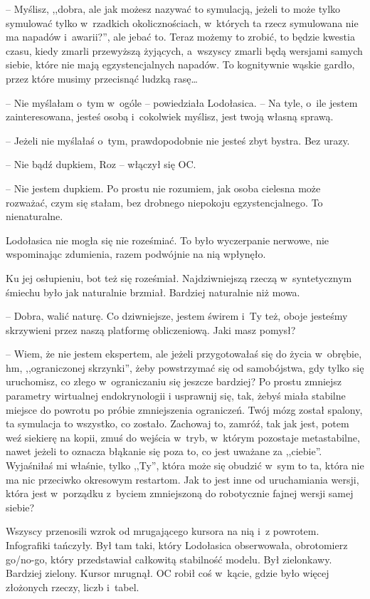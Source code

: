 \documentclass[oneside,polish,11pt,sfheadings]{mwbk}
\begin{document}
-- Myślisz, ,,dobra, ale jak możesz nazywać to symulacją, jeżeli to może
tylko symulować tylko w~rzadkich okolicznościach, w~których ta rzecz
symulowana nie ma napadów i~awarii?'', ale jebać to. Teraz możemy to
zrobić, to będzie kwestia czasu, kiedy zmarli przewyższą żyjących, a~wszyscy zmarli będą wersjami samych siebie, które nie mają
egzystencjalnych napadów. To kognitywnie wąskie gardło, przez które
musimy przecisnąć ludzką rasę\ldots 

-- Nie myślałam o~tym w~ogóle -- powiedziała Lodołasica. -- Na tyle, o~ile
jestem zainteresowana, jesteś osobą i~cokolwiek myślisz, jest twoją
własną sprawą.

-- Jeżeli nie myślałaś o~tym, prawdopodobnie nie jesteś zbyt bystra. Bez
urazy.

-- Nie bądź dupkiem, Roz -- włączył się OC.

-- Nie jestem dupkiem. Po prostu nie rozumiem, jak osoba cielesna może
rozważać, czym się stałam, bez drobnego niepokoju egzystencjalnego. To
nienaturalne.

Lodołasica nie mogła się nie roześmiać. To było wyczerpanie nerwowe, nie
wspominając zdumienia, razem podwójnie na nią wpłynęło.

Ku jej osłupieniu, bot też się roześmiał. Najdziwniejszą rzeczą w~syntetycznym śmiechu było jak naturalnie brzmiał. Bardziej naturalnie
niż mowa.

-- Dobra, walić naturę. Co dziwniejsze, jestem świrem i~Ty też, oboje
jesteśmy skrzywieni przez naszą platformę obliczeniową. Jaki masz
pomysł?

-- Wiem, że nie jestem ekspertem, ale jeżeli przygotowałaś się do życia w~obrębie, hm, ,,ograniczonej skrzynki'', żeby powstrzymać się od
samobójstwa, gdy tylko się uruchomisz, co złego w~ograniczaniu się
jeszcze bardziej? Po prostu zmniejsz parametry wirtualnej endokrynologii
i usprawnij się, tak, żebyś miała stabilne miejsce do powrotu po próbie
zmniejszenia ograniczeń. Twój mózg został spalony, ta symulacja to
wszystko, co zostało. Zachowaj to, zamróź, tak jak jest, potem weź
siekierę na kopii, zmuś do wejścia w~tryb, w~którym pozostaje
metastabilne, nawet jeżeli to oznacza błąkanie się poza to, co jest
uważane za ,,ciebie''. Wyjaśniłaś mi właśnie, tylko ,,Ty'', która może
się obudzić w~sym to ta, która nie ma nic przeciwko okresowym restartom.
Jak to jest inne od uruchamiania wersji, która jest w~porządku z~byciem
zmniejszoną do robotycznie fajnej wersji samej siebie?

Wszyscy przenosili wzrok od mrugającego kursora na nią i~z powrotem.
Infografiki tańczyły. Był tam taki, który Lodołasica obserwowała,
obrotomierz go/no-go, który przedstawiał całkowitą stabilność modelu.
Był zielonkawy. Bardziej zielony. Kursor mrugnął. OC robił coś w~kącie,
gdzie było więcej złożonych rzeczy, liczb i~tabel.
\end{document}
